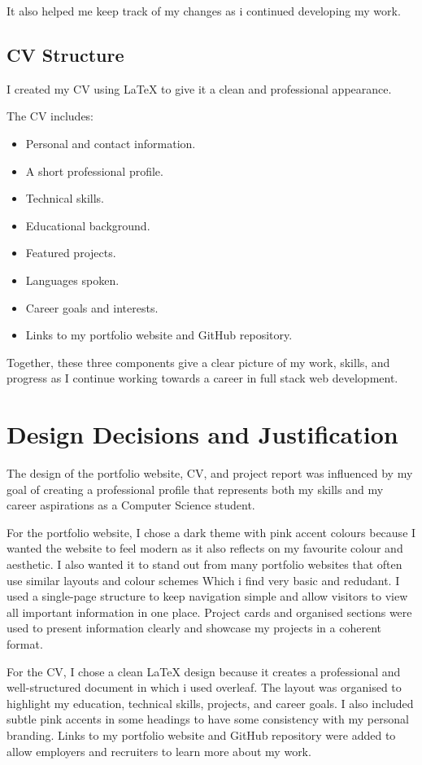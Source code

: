 \documentclass[12pt,a4paper]{article}
\begin{document}
It also helped me keep track of my changes as i continued developing my work.

\subsection{CV Structure}

I created my CV using LaTeX to give it a clean and professional appearance.

The CV includes:

\begin{itemize}
\item Personal and contact information.
\item A short professional profile.
\item Technical skills.
\item Educational background.
\item Featured projects.
\item Languages spoken.
\item Career goals and interests.
\item Links to my portfolio website and GitHub repository.
\end{itemize}

Together, these three components give a clear picture of my work, skills, and progress as I continue working towards a career in full stack web development.


\section{Design Decisions and Justification}

The design of the portfolio website, CV, and project report was influenced by my goal of creating a professional profile that represents both my skills and my career aspirations as a Computer Science student.

For the portfolio website, I chose a dark theme with pink accent colours because I wanted the website to feel modern as it also reflects on my favourite colour and aesthetic. I also wanted it to stand out from many portfolio websites that often use similar layouts and colour schemes Which i find very basic and redudant. I used a single-page structure to keep navigation simple and allow visitors to view all important information in one place. Project cards and organised sections were used to present information clearly and showcase my projects in a coherent format.

For the CV, I chose a clean LaTeX design because it creates a professional and well-structured document in which i used overleaf. The layout was organised to highlight my education, technical skills, projects, and career goals. I also included subtle pink accents in some headings to have some consistency with my personal branding. Links to my portfolio website and GitHub repository were added to allow employers and recruiters to learn more about my work.
\end{document}
